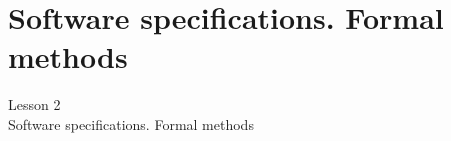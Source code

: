 \documentclass[aspectratio=1610]{beamer}
\begin{document}






\section{Software specifications. Formal methods}


\begin{frame}
\begin{center}
\Huge Lesson 2\\
Software specifications. Formal methods
\end{center}
\end{frame}





    
    
\end{document}
